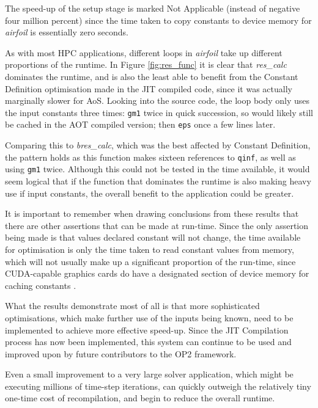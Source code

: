 The speed-up of the setup stage is marked Not Applicable (instead of negative four million percent) since the time taken to copy constants to device memory for \textit{airfoil} is essentially zero seconds.


As with most HPC applications, different loops in \textit{airfoil} take up different proportions of the runtime. In Figure \ref{fig:res_func} it is clear that \textit{res\_calc} dominates the runtime, and is also the least able to benefit from the Constant Definition optimisation made in the JIT compiled code, since it was actually marginally slower for AoS. Looking into the source code, the loop body only uses the input constants three times: \verb|gm1| twice in quick succession, so would likely still be cached in the AOT compiled version; then \verb|eps| once a few lines later.
\par
Comparing this to \textit{bres\_calc}, which was the best affected by Constant Definition, the pattern holds as this function makes sixteen references to \verb|qinf|, as well as using \verb|gm1| twice. Although this could not be tested in the time available, it would seem logical that if the function that dominates the runtime is also making heavy use if input constants, the overall benefit to the application could be greater.
\par
\vspace{4em}
It is important to remember when drawing conclusions from these results that there are other assertions that can be made at run-time. Since the only assertion being made is that values declared constant will not change, the time available for optimisation is only the time taken to read constant values from memory, which will not usually make up a significant proportion of the run-time, since CUDA-capable graphics cards do have a designated section of device memory for caching constants \cite[p73]{guide}.
\par
What the results demonstrate most of all is that more sophisticated optimisations, which make further use of the inputs being known, need to be implemented to achieve more effective speed-up. Since the JIT Compilation process has now been implemented, this system can continue to be used and improved upon by future contributors to the OP2 framework.
\par
Even a small improvement to a very large solver application, which might be executing millions of time-step iterations, can quickly outweigh the relatively tiny one-time cost of recompilation, and begin to reduce the overall runtime.
